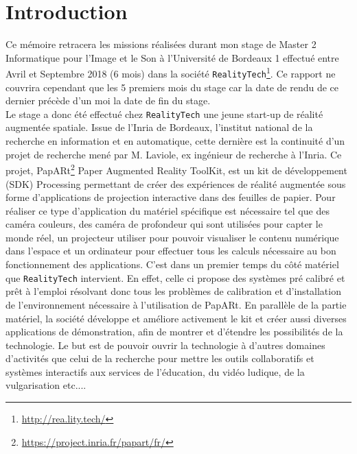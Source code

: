 \chapter{Introduction}
\label{chap:intro}

Ce mémoire retracera les missions réalisées durant mon stage de Master 2 Informatique pour l'Image et le Son à l'Université de Bordeaux 1 effectué entre Avril et Septembre 2018 (6 mois) dans la société \texttt{RealityTech}\footnote{\href{http://rea.lity.tech/}{http://rea.lity.tech/}}. Ce rapport ne couvrira cependant que les 5 premiers mois du stage car la date de rendu de ce dernier précède d'un moi la date de fin du stage.\\

Le stage a donc été effectué chez \texttt{RealityTech} une jeune start-up de réalité augmentée spatiale. Issue de l'Inria de Bordeaux, l'institut national de la recherche en information et en automatique, cette dernière est la continuité d'un projet de recherche mené par M. Laviole, ex ingénieur de recherche à l'Inria. Ce projet, PapARt\footnote{\href{https://project.inria.fr/papart/fr/}{https://project.inria.fr/papart/fr/}} Paper Augmented Reality ToolKit, est un kit de développement (SDK) Processing permettant de créer des expériences de réalité augmentée sous forme d'applications de projection interactive dans des feuilles de papier. Pour réaliser ce type d'application du matériel spécifique est nécessaire tel que des caméra couleurs, des caméra de profondeur qui sont utilisées pour capter le monde réel, un projecteur utiliser pour pouvoir visualiser le contenu numérique dans l'espace et un ordinateur pour effectuer tous les calculs nécessaire au bon fonctionnement des applications. C'est dans un premier temps du côté matériel que \texttt{RealityTech} intervient. En effet, celle ci propose des systèmes pré calibré et prêt à l'emploi résolvant donc tous les problèmes de calibration et d'installation de l'environnement nécessaire à l'utilisation de PapARt. En parallèle de la partie matériel, la société développe et améliore activement le kit et créer aussi diverses applications de démonstration, afin de montrer et d'étendre les possibilités de la technologie. Le but est de pouvoir ouvrir la technologie à d'autres domaines d'activités que celui de la recherche pour mettre les outils collaboratifs et systèmes interactifs aux services de l'éducation, du vidéo ludique, de la vulgarisation etc....


